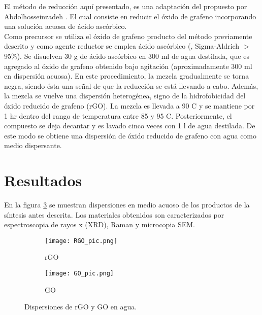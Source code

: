 El método de reducción aquí presentado, es una adaptación del propuesto por Abdolhosseinzadeh \citep{Abdolhosseinzadeh2015}. El cual consiste en reducir el óxido de grafeno incorporando una solución acuosa de ácido ascórbico.
\\
Como precursor se utiliza el óxido de grafeno producto del método previamente descrito y como agente reductor se emplea ácido ascórbico (, Sigma-Aldrich $>$95\%). Se disuelven 30 g de ácido ascórbico en 300 ml de agua destilada, que es agregado al óxido de grafeno obtenido bajo agitación (aproximadamente 300 ml en dispersión acuosa). En este procedimiento, la mezcla gradualmente se torna negra, siendo ésta una señal de que la reducción se está llevando a cabo. Además, la mezcla se vuelve una dispersión heterogénea, signo de la hidrofobicidad del óxido reducido de grafeno (rGO). La mezcla es llevada a 90 \degree C y se mantiene por 1 hr dentro del rango de temperatura entre 85 y 95 \degree C. Posteriormente, el compuesto se deja decantar y es lavado cinco veces con 1 l de agua destilada. De este modo se obtiene una dispersión de óxido reducido de grafeno con agua como medio dispersante.

\section{Resultados}
En la figura \ref{fig:RGOyGO} se muestran dispersiones en medio acuoso de los productos de la síntesis antes descrita.
Los materiales obtenidos son caracterizados por espectroscopia de rayos x (XRD), Raman y microcopia SEM.

\begin{figure}[h]
	\centering
	\begin{subfigure}{0.4\textwidth}
		\texttt{[image: RGO\_pic.png]}
		\caption{rGO}
		\label{fig:RGO}
	\end{subfigure}
	\begin{subfigure}{0.42\textwidth}
		\texttt{[image: GO\_pic.png]}
		\caption{GO}
		\label{fig:GO}
	\end{subfigure}
	\caption{Dispersiones de rGO y GO en agua.}
	\label{fig:RGOyGO}
\end{figure}

